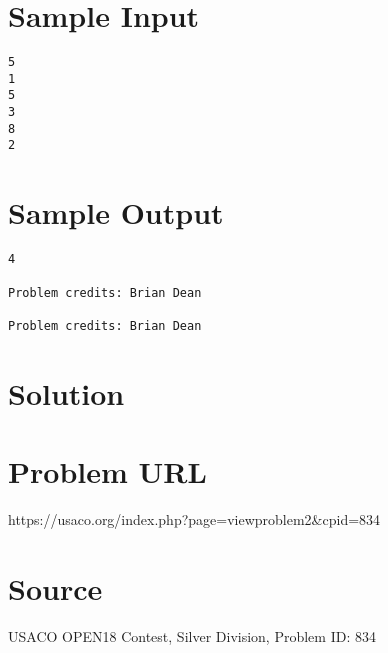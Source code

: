 \documentclass[12pt]{article}
\begin{document}
\section*{Sample Input}
\begin{verbatim}
5
1
5
3
8
2
\end{verbatim}

\section*{Sample Output}
\begin{verbatim}
4

Problem credits: Brian Dean

Problem credits: Brian Dean
\end{verbatim}

\section*{Solution}


\section*{Problem URL}
https://usaco.org/index.php?page=viewproblem2&cpid=834

\section*{Source}
USACO OPEN18 Contest, Silver Division, Problem ID: 834
\end{document}
